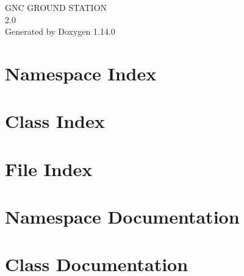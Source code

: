 \documentclass[twoside]{book}
\newcommand{\+}{\discretionary{\mbox{\scriptsize$\hookleftarrow$}}{}{}}
\newcommand{\clearemptydoublepage}{%
    \newpage{\pagestyle{empty}\cleardoublepage}%
  }
\begin{document}
  \raggedbottom
    \hypersetup{pageanchor=false,
                bookmarksnumbered=true,
                pdfencoding=unicode
               }
  \begin{titlepage}
  \vspace*{7cm}
  \begin{center}%
  {\Large GNC GROUND STATION}\\
  [1ex]\large 2.\+0 \\
  \vspace*{1cm}
  {\large Generated by Doxygen 1.14.0}\\
  \end{center}
  \end{titlepage}
  \clearemptydoublepage
  \tableofcontents
  \clearemptydoublepage
  \hypersetup{pageanchor=true}
\chapter{Namespace Index}

\chapter{Class Index}

\chapter{File Index}

\chapter{Namespace Documentation}

\chapter{Class Documentation}









\end{document}
